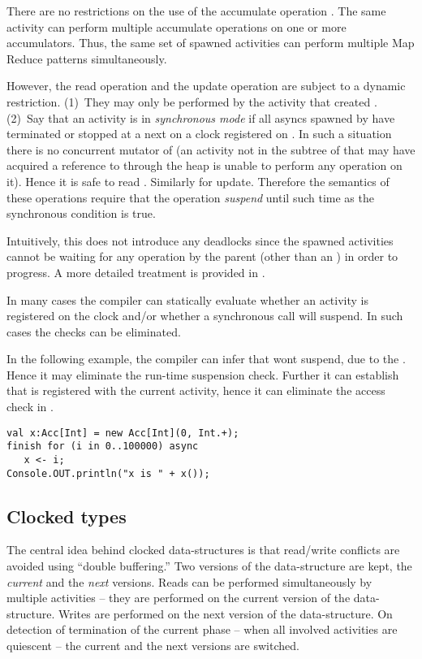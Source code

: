 There are no restrictions on the use of the accumulate operation
. The same activity can perform multiple accumulate
operations on one or more accumulators. Thus, the same set of spawned
activities can perform multiple Map Reduce patterns simultaneously.

However, the read operation  and the update operation
 are subject to a dynamic restriction. (1)~They may only
be performed by the activity that created . (2)~Say that an
activity  is in {\em synchronous mode} if all asyncs spawned
by  have terminated or stopped at a next on a clock registered
on .  In such a situation there is no concurrent mutator of
 (an activity not in the subtree of  that may have
acquired a reference to  through the heap is unable to perform
any operation on it). Hence it is safe to read . Similarly for
update. Therefore the semantics of these operations require that the
operation {\em suspend} until such time as the synchronous condition
is true.

Intuitively, this does not introduce any deadlocks since the
spawned activities cannot be waiting for any operation by the parent
(other than an ) in order to progress. A more detailed
treatment is provided in .


In many cases the compiler can statically evaluate whether an activity
is registered on the clock and/or whether a synchronous call will
suspend. In such cases the checks can be eliminated.
\begin{example}
In the following example, the compiler can infer that  wont suspend, due to
the . Hence it may eliminate the run-time suspension
check. Further it can establish that  is 
registered with the current activity, hence it can eliminate the
access check in .
\begin{lstlisting}
val x:Acc[Int] = new Acc[Int](0, Int.+);
finish for (i in 0..100000) async
   x <- i;
Console.OUT.println("x is " + x());
\end{lstlisting}

\end{example}

\subsection{Clocked types}

The central idea behind clocked data-structures is that read/write
conflicts are avoided using ``double buffering.'' Two versions of the
data-structure are kept, the {\em current} and the {\em next}
versions. Reads can be performed simultaneously by multiple activities
-- they are performed on the current version of the
data-structure. Writes are performed on the next version of the
data-structure. On detection of termination of the current phase --
when all involved activities are quiescent -- the current and the next
versions are switched.

